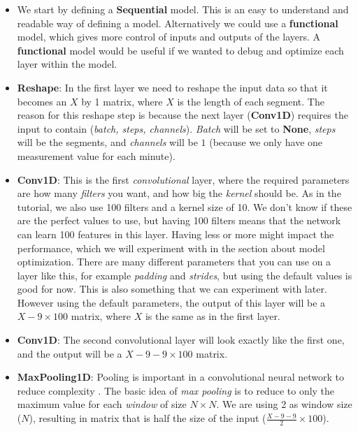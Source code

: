 \begin{itemize}
  \item We start by defining a \textbf{Sequential} model. This is an easy to understand and readable way of defining a model. 
        Alternatively we could use a \textbf{functional} model, which gives more control of inputs and outputs of the layers.
        A \textbf{functional} model would be useful if we wanted to debug and optimize each layer within the model.
  \item \textbf{Reshape}: In the first layer we need to reshape the input data so that it becomes an $X$ by 1 matrix, where $X$ is the length of each segment.
        The reason for this reshape step is because the next layer (\textbf{Conv1D}) requires the input to contain (\textit{batch, steps, channels}). 
        \textit{Batch} will be set to \textbf{None}, \textit{steps} will be the segments, and \textit{channels} will be $1$ 
        (because we only have one measurement value for each minute).
  \item \textbf{Conv1D}: This is the first \textit{convolutional} layer, where the required parameters are how many \textit{filters} 
        you want, and how big the \textit{kernel} should be. As in the tutorial, we also use 100 filters and a kernel size of 10. 
        We don't know if these are the perfect values to use, but having 100 filters means that the network can learn 100 features in this layer.
        Having less or more might impact the performance, which we will experiment with in the section about model optimization.
        There are many different parameters that you can use on a layer like this, for example \textit{padding} and \textit{strides},
        but using the default values is good for now. This is also something that we can experiment with later.
        However using the default parameters, the output of this layer will be a $X-9 \times 100$ matrix, where $X$ is the same as in the first layer.
  \item \textbf{Conv1D}: The second convolutional layer will look exactly like the first one, and the output will be a $X-9-9 \times 100$ matrix. 
  \item \textbf{MaxPooling1D}: Pooling is important in a convolutional neural network to reduce complexity \cite{1d_cnn}. 
        The basic idea of \textit{max pooling} is to reduce to only the maximum value for each \textit{window} of size $N \times N$. We are using 2 as 
        window size ($N$), resulting in matrix that is half the size of the input ($ \frac{X-9-9}{2} \times 100$). 

\end{itemize}
